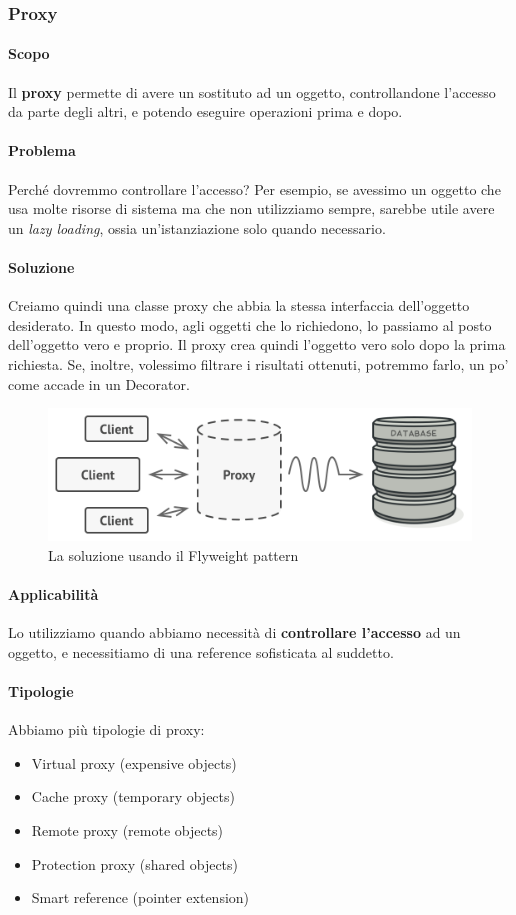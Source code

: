 \documentclass[11pt]{article}
\begin{document}
\subsubsection{Proxy}
\paragraph{Scopo}
Il \textbf{proxy} permette di avere un sostituto ad un oggetto, controllandone l'accesso da parte degli altri, e potendo eseguire operazioni prima e dopo. 
\paragraph{Problema}
Perché dovremmo controllare l'accesso? Per esempio, se avessimo un oggetto che usa molte risorse di sistema ma che non utilizziamo sempre, sarebbe utile avere un \textit{lazy loading}, ossia un'istanziazione solo quando necessario. 

\paragraph{Soluzione}
Creiamo quindi una classe proxy che abbia la stessa interfaccia dell'oggetto desiderato. In questo modo, agli oggetti che lo richiedono, lo passiamo al posto dell'oggetto vero e proprio. Il proxy crea quindi l'oggetto vero solo dopo la prima richiesta. Se, inoltre, volessimo filtrare i risultati ottenuti, potremmo farlo, un po' come accade in un Decorator.
\begin{figure}[H]
    \includegraphics[width=\linewidth]{res/teoria/Proxy.png}
    \caption{La soluzione usando il Flyweight pattern}
\end{figure}
\paragraph{Applicabilità}
Lo utilizziamo quando abbiamo necessità di \textbf{controllare l'accesso} ad un oggetto, e necessitiamo di una reference sofisticata al suddetto.
\paragraph{Tipologie}
Abbiamo più tipologie di proxy:
\begin{itemize}
    \item Virtual proxy (expensive objects) 
    \item Cache proxy (temporary objects) 
    \item Remote proxy (remote objects)
    \item Protection proxy (shared objects)
    \item Smart reference (pointer extension)
\end{itemize}
\end{document}
